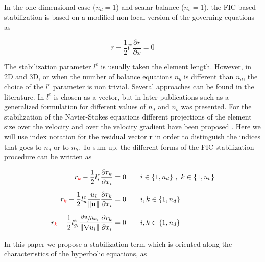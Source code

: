 \documentclass[a4paper,12pt]{elsarticle}
\newcommand{\Miguel}[1]{\textcolor{red}{#1}}
\newcommand{\pder}[2]{\frac{\partial#1}{\partial#2}}
\newcommand{\norm}[1]{\lVert#1\rVert}
\begin{document}
In the one dimensional case ($n_d=1$) and scalar balance ($n_b=1$), the FIC-based stabilization is based on a modified non local version of the governing equations as \cite{onate1998}

\begin{equation}
r - \frac{1}{2}l^e\pder{r}{x} = 0
\end{equation}

The stabilization parameter $l^e$ is usually taken the element length. However, in 2D and 3D, or when the number of balance equations $n_b$ is different than $n_d$, the choice of the $l^e$ parameter is non trivial.
Several approaches can be found in the literature. In \cite{onate1998} $l^e$ is chosen as a vector, but in later publications such as \cite{onate2001} a generalized formulation for different values of $n_d$ and $n_b$ was presented.
For the stabilization of the Navier-Stokes equations different projections of the element size over the velocity and over the velocity gradient have been proposed \cite{cotela2016}. Here we will use index notation for the residual vector $\mathbf{r}$ in order to distinguish the indices that goes to $n_d$ or to $n_b$. To sum up, the different forms of the FIC stabilization procedure can be written as

\begin{subequations}
\begin{align}
r_{\Miguel{k}} - \frac{1}{2}l^e_i\pder{r_k}{x_i} &= 0
    \qquad i\in\{1,n_d\} \ ,\ k\in\{1,n_b\}\\[5pt]
r_{\Miguel{k}} - \frac{1}{2}l^e_u\frac{u_i}{\norm{\mathbf{u}}}\pder{r_k}{x_i} &= 0
    \qquad i,k\in\{1,n_d\}\\[5pt]
r_{\Miguel{k}} - \frac{1}{2}l^e_{g_i}\frac{\sfrac{\partial\mathbf{u}}{\partial x_i}}{\norm{\nabla u_i}}\pder{r_k}{x_i} &= 0
    \qquad i,k\in\{1,n_d\}
\end{align}
\end{subequations}

In this paper we propose a stabilization term which is oriented along the characteristics of the hyperbolic equations, as
\end{document}
